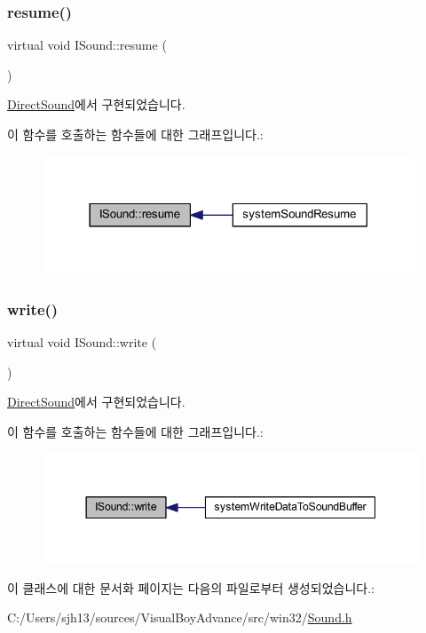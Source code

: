 \subsubsection{\texorpdfstring{resume()}{resume()}}
{\footnotesize\ttfamily virtual void I\+Sound\+::resume (\begin{DoxyParamCaption}{ }\end{DoxyParamCaption})\hspace{0.3cm}{\ttfamily [pure virtual]}}



\mbox{\hyperlink{class_direct_sound_a529b060d31bb252968bc9a387a7dc9ad}{Direct\+Sound}}에서 구현되었습니다.

이 함수를 호출하는 함수들에 대한 그래프입니다.\+:
\nopagebreak
\begin{figure}[H]
\begin{center}
\leavevmode
\includegraphics[width=314pt]{class_i_sound_a8e0adea68f52a7f0392a3988a558aaf0_icgraph}
\end{center}
\end{figure}
\mbox{\label{class_i_sound_ad7913f5fa003c06e8e1a930f760d20e2}} 
\subsubsection{\texorpdfstring{write()}{write()}}
{\footnotesize\ttfamily virtual void I\+Sound\+::write (\begin{DoxyParamCaption}{ }\end{DoxyParamCaption})\hspace{0.3cm}{\ttfamily [pure virtual]}}



\mbox{\hyperlink{class_direct_sound_a2e2a78f3a6719920fb2a9dfc48e4b1db}{Direct\+Sound}}에서 구현되었습니다.

이 함수를 호출하는 함수들에 대한 그래프입니다.\+:
\nopagebreak
\begin{figure}[H]
\begin{center}
\leavevmode
\includegraphics[width=344pt]{class_i_sound_ad7913f5fa003c06e8e1a930f760d20e2_icgraph}
\end{center}
\end{figure}


이 클래스에 대한 문서화 페이지는 다음의 파일로부터 생성되었습니다.\+:\begin{DoxyCompactItemize}
\item 
C\+:/\+Users/sjh13/sources/\+Visual\+Boy\+Advance/src/win32/\mbox{\hyperlink{win32_2_sound_8h}{Sound.\+h}}\end{DoxyCompactItemize}
